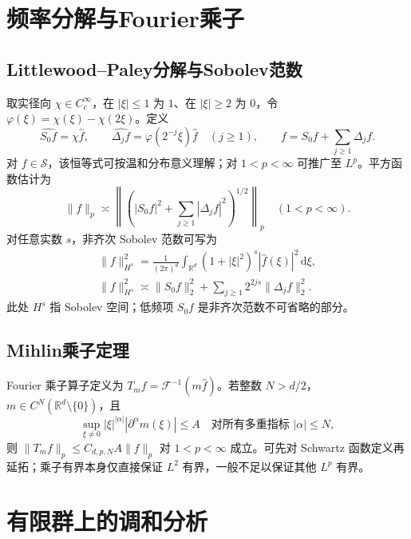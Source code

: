 \documentclass[../main.tex]{subfiles}
\begin{document}
\section{频率分解与Fourier乘子}
\subsection{Littlewood--Paley分解与Sobolev范数}
取实径向 $\chi\in C_c^\infty$，在 $|\xi|\le1$ 为 $1$、在 $|\xi|\ge2$ 为 $0$，令 $\varphi(\xi)=\chi(\xi)-\chi(2\xi)$。定义
\[
\widehat{S_0f}=\chi\widehat f,\qquad
\widehat{\Delta_jf}=\varphi(2^{-j}\xi)\widehat f\quad(j\ge1),\qquad
f=S_0f+\sum_{j\ge1}\Delta_jf.
\]
对 $f\in\mathcal S$，该恒等式可按温和分布意义理解；对 $1<p<\infty$ 可推广至 $L^p$。平方函数估计为
\[
\|f\|_p\asymp
\left\|\left(|S_0f|^2+\sum_{j\ge1}|\Delta_jf|^2\right)^{1/2}\right\|_p
\quad(1<p<\infty).
\]
对任意实数 $s$，非齐次 Sobolev 范数可写为
\begin{gather*}
\|f\|_{H^s}^2=\frac1{(2\pi)^d}\int_{\mathbb R^d}(1+|\xi|^2)^s|\widehat f(\xi)|^2\,\mathrm d\xi,\\
\|f\|_{H^s}^2\asymp\|S_0f\|_2^2+\sum_{j\ge1}2^{2js}\|\Delta_jf\|_2^2.
\end{gather*}
此处 $H^s$ 指 Sobolev 空间；低频项 $S_0f$ 是非齐次范数不可省略的部分。
\subsection{Mihlin乘子定理}
Fourier 乘子算子定义为 $T_mf=\mathcal F^{-1}(m\widehat f)$。若整数 $N>d/2$，$m\in C^N(\mathbb R^d\setminus\{0\})$，且
\[
\sup_{\xi\ne0}|\xi|^{|\alpha|}|\partial^\alpha m(\xi)|\le A
\quad\text{对所有多重指标 }|\alpha|\le N,
\]
则 $\|T_mf\|_p\le C_{d,p,N}A\|f\|_p$ 对 $1<p<\infty$ 成立。可先对 Schwartz 函数定义再延拓；乘子有界本身仅直接保证 $L^2$ 有界，一般不足以保证其他 $L^p$ 有界。
\section{有限群上的调和分析}
\end{document}
